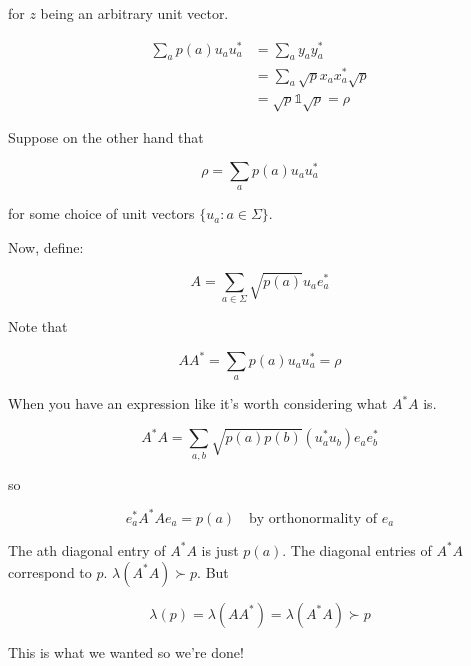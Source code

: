 \documentclass{article}
\begin{document}
        for $z$ being an arbitrary unit vector.

        \begin{align*}
            \sum_a p(a) u_a u_a^* &= \sum_a y_a y_a^* \\
                                  &=\sum_a \sqrt{p} x_a x_a^* \sqrt{p} \\
                                  &=\sqrt{p} \mathds{1} \sqrt{p} = \rho
        \end{align*}
        
        Suppose on the other hand that 

        \[ 
                \rho = \sum_a p(a) u_a u_a^* 
        \]
        
        for some choice of unit vectors $\{ u_a: a \in \Sigma\}$.

        Now, define:
        
        \[ 
                A = \sum_{a \in \Sigma} \sqrt{p(a)} u_a e_a^* 
        \]
        
        Note that 

        \[ 
                A A^* = \sum_a p(a) u_a u_a^* = \rho 
        \]
        
        When you have an expression like it's worth considering what $A^*A$ is.

        \[ 
                A^*A = \sum_{a,b} \sqrt{p(a)p(b)}(u_a^* u_b) e_a e_b^*
        \]
        
        so

        \[ 
                e_a^* A^* A e_a = p(a) \quad \text{by orthonormality of $e_a$} 
        \]
        
        The ath diagonal entry of $A^*A$ is just $p(a)$. The diagonal entries
    of $A^*A$ correspond to $p$. $\lambda(A^* A) \succ p$. But

    \[ 
            \lambda(p) = \lambda(A A^*) = \lambda(A^*A) \succ p 
    \]
    
    This is what we wanted so we're done!
\end{document}
